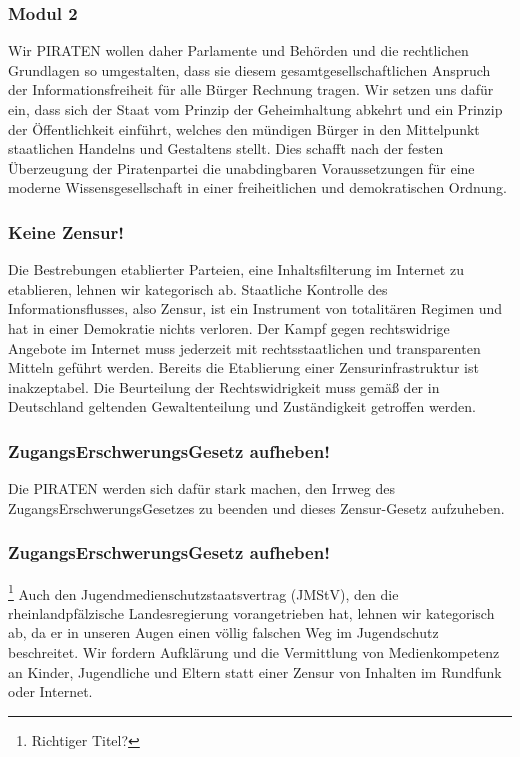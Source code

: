 \subsubsection{Modul 2}
\abstimmung
Wir PIRATEN wollen daher Parlamente und Behörden und die rechtlichen Grundlagen so umgestalten, dass sie diesem gesamtgesellschaftlichen Anspruch der Informationsfreiheit für alle Bürger Rechnung tragen. Wir setzen uns dafür ein, dass sich der Staat vom Prinzip der Geheimhaltung abkehrt und ein Prinzip der Öffentlichkeit einführt, welches den mündigen Bürger in den Mittelpunkt staatlichen Handelns und Gestaltens stellt. Dies schafft nach der festen Überzeugung der Piratenpartei die unabdingbaren Voraussetzungen für eine moderne Wissensgesellschaft in einer freiheitlichen und demokratischen Ordnung.
 
\subsubsection{Keine Zensur!}
\abstimmung
Die Bestrebungen etablierter Parteien, eine Inhaltsfilterung im Internet zu etablieren, lehnen wir kategorisch ab. Staatliche Kontrolle des Informationsflusses, also Zensur, ist ein Instrument von totalitären Regimen und hat in einer Demokratie nichts verloren. Der Kampf gegen rechtswidrige Angebote im Internet muss jederzeit mit rechtsstaatlichen und transparenten Mitteln geführt werden. Bereits die Etablierung einer Zensurinfrastruktur ist inakzeptabel. Die Beurteilung der Rechtswidrigkeit muss gemäß der in Deutschland geltenden Gewaltenteilung und Zuständigkeit getroffen werden.

\subsubsection{ZugangsErschwerungsGesetz aufheben!}
\abstimmung
Die PIRATEN werden sich dafür stark machen, den Irrweg des ZugangsErschwerungsGesetzes zu beenden und dieses Zensur-Gesetz aufzuheben.

\subsubsection{ZugangsErschwerungsGesetz aufheben!}\footnote{Richtiger Titel?}
\abstimmung
Auch den Jugendmedienschutzstaatsvertrag (JMStV), den die rheinlandpfälzische Landesregierung vorangetrieben hat, lehnen wir kategorisch ab, da er in unseren Augen einen völlig falschen Weg im Jugendschutz beschreitet. Wir fordern Aufklärung und die Vermittlung von Medienkompetenz an Kinder, Jugendliche und Eltern statt einer Zensur von Inhalten im Rundfunk oder Internet.
 
